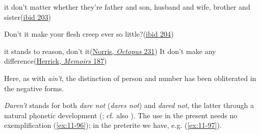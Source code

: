 \ex
it don't matter whether they're father and son, husband and wife, brother and sister\hfill(\href{https://archive.org/details/playspleasantunp01shaw/page/210/mode/2up?q=don%27t&view=theater}{ibid 203})

\ex
Don't it make your flesh creep ever so little?\hfill(\href{https://archive.org/details/playspleasantunp01shaw/page/212/mode/2up?q=don%27t&view=theater}{ibid 204})

\ex \label{ex:11-91}
it stands to reason, don't it\hfill(\href{https://archive.org/details/octopusstoryofca00norruoft/page/230/mode/2up?view=theater&q=%22stands+to+reason%22}{Norris, \textit{Octopus} 231}) %
\ex \label{ex:11-herrick}
It don't make any difference\hfill(\href{https://archive.org/details/memoirsofamerica0000robe/page/186/mode/2up?view=theater&q=%22make+any+difference%22}{Herrick, \textit{Memoirs} 187})
\z
\z
{}

Here, as with \textit{ain't}, the distinction of person and number has been obliterated in the negative forms.\largerpage[2]


\textit{Daren't} stands for both \textit{dare not} (\textit{dares not}) and \textit{dared not}, the latter through a natural phonetic development (\cite[\href{https://archive.org/details/a-modern-english-grammar-on-historical-principles.-jespersen-otto-1860-1943-hais/page/222/mode/2up?view=theater}{7.72}]{jespersenMEG1}; cf. also \cite[\href{https://www.google.com/books/edition/Englische_Studien/ELM_AQAAMAAJ?hl=en&gbpv=1&pg=PA461}{461}]{jespersen1896dare}). The use in the present needs no exemplification (\ref{ex:11-96}); in the preterite we have, e.g. (\ref{ex:11-97}).

